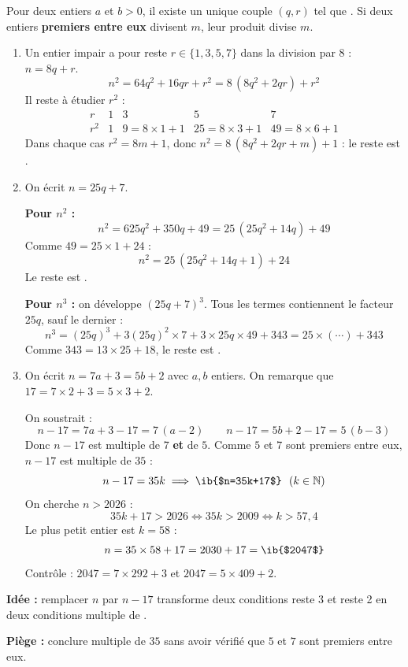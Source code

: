 \begin{prop}
Pour deux entiers $a$ et $b>0$, il existe un unique couple $(q,r)$ tel que . Si deux entiers \textbf{premiers entre eux} divisent $m$, leur produit divise $m$.
\end{prop}
\begin{enumerate}
  \item Un entier impair a pour reste $r\in\{1,3,5,7\}$ dans la division par $8$ : $n=8q+r$.
  \[n^2=64q^2+16qr+r^2=8\,(8q^2+2qr)+r^2\]
  Il reste à étudier $r^2$ :
  \[\begin{array}{c|c|c|c|c}
  r&1&3&5&7\\\hline
  r^2&1&9=8\times1+1&25=8\times3+1&49=8\times6+1
  \end{array}\]
  Dans chaque cas $r^2=8m+1$, donc $n^2=8\,(8q^2+2qr+m)+1$ : le reste est .

  \item On écrit $n=25q+7$.

  \textbf{Pour $n^2$ :}
  \[n^2=625q^2+350q+49=25\,(25q^2+14q)+49\]
  Comme $49=25\times1+24$ :
  \[n^2=25\,(25q^2+14q+1)+24\]
  Le reste est .

  \textbf{Pour $n^3$ :} on développe $(25q+7)^3$. Tous les termes contiennent le facteur $25q$, sauf le dernier :
  \[n^3=(25q)^3+3(25q)^2\times7+3\times25q\times49+343=25\times(\cdots)+343\]
  Comme $343=13\times25+18$, le reste est .

  \item On écrit $n=7a+3=5b+2$ avec $a,b$ entiers. On remarque que $17=7\times2+3=5\times3+2$.

  On soustrait :
  \[n-17=7a+3-17=7\,(a-2)\qquad n-17=5b+2-17=5\,(b-3)\]
  Donc $n-17$ est multiple de $7$ \textbf{et} de $5$. Comme $5$ et $7$ sont premiers entre eux, $n-17$ est multiple de $35$ :
  \[n-17=35k\implies\ib{$n=35k+17$}\ \ (k\in\mathbb N)\]
  On cherche $n>2026$ :
  \[35k+17>2026\iff35k>2009\iff k>57{,}4\]
  Le plus petit entier est $k=58$ :
  \[n=35\times58+17=2030+17=\ib{$2047$}\]
  Contrôle : $2047=7\times292+3$ et $2047=5\times409+2$.
\end{enumerate}
\textbf{Idée :} remplacer $n$ par $n-17$ transforme deux conditions \og reste 3 \fg{} et \og reste 2 \fg{} en deux conditions \og multiple de \fg{}.

\textbf{Piège :} conclure \og multiple de $35$ \fg{} sans avoir vérifié que $5$ et $7$ sont premiers entre eux.
